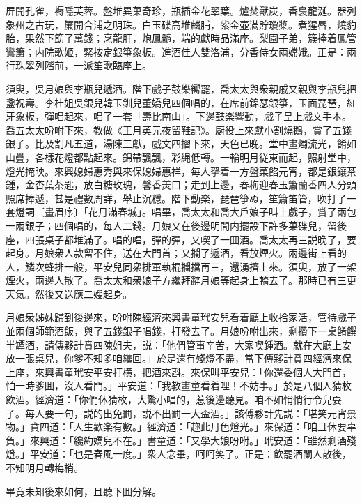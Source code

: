 \begin{myquote}
屏開孔雀，褥隱芙蓉。盤堆異菓奇珍，瓶插金花翠葉。爐焚獸炭，香裊龍涎。器列象州之古玩，簾開合浦之明珠。白玉碟高堆麟脯，紫金壺滿貯瓊槳。煮猩唇，燒豹胎，果然下筯了萬錢；烹龍肝，炮鳳髓，端的獻時品滿座。梨園子弟，簇捧着鳳管鸞簫；内院歌姬，緊按定銀箏象板。進酒佳人雙洛浦，分香侍女兩嫦娥。正是：兩行珠翠列階前，一派笙歌臨座上。
\end{myquote}

須臾，吳月娘與李瓶兒遞酒。階下戲子鼓樂嚮罷，喬太太與衆親戚又親與李瓶兒把盞祝壽。李桂姐吳銀兒韓玉釧兒董嬌兒四個唱的，在席前錦瑟銀箏，玉面琵琶，紅牙象板，彈唱起來，唱了一套「壽比南山」。下邊鼓楽響動，戲子呈上戲文手本。喬五太太吩咐下來，教做《王月英元夜留鞋記》。廚役上來獻小割燒鵝，賞了五錢銀子。比及割凡五道，湯陳三獻，戲文四摺下來，天色已晚。堂中畫燭流光，餚如山疊，各樣花燈都點起來。錦帶飄飄，彩䋲低轉。一輪明月従東而起，照射堂中，燈光掩映。來興媳婦惠秀與來保媳婦惠祥，每人拏着一方盤菓餡元宵，都是銀鑲茶鍾，金杏葉茶匙，放白糖玫瑰，馨香羙口；走到上邊，春梅迎春玉簫蘭香四人分頭照席捧遞，甚是禮數周詳，舉止沉穩。階下動楽，琵琶箏ぬ，笙簫笛管，吹打了一套燈詞〔畫眉序〕「花月滿春城」。唱畢，喬太太和喬大戶娘子叫上戲子，賞了兩包一兩銀子；四個唱的，每人二錢。月娘又在後邊明間内擺設下許多菓碟兒，留後座，四張桌子都堆滿了。唱的唱，彈的彈，又喫了一囬酒。喬太太再三説晚了，要起身。月娘衆人款留不住，送在大門首；又攔了遞酒，看放煙火。兩邊街上看的人，鱗次蜂排一般，平安兒同衆排軍執棍攔擋再三，還湧擠上來。須臾，放了一架煙火，兩邊人散了。喬太太和衆娘子方纔拜辭月娘等起身上轎去了。那時已有三更天氣。然後又送應二嫂起身。

月娘衆姊妹歸到後邊來，吩咐陳經濟來興書童玳安兒看着廳上收拾家活，管待戲子並兩個師範酒飯，與了五錢銀子唱錢，打發去了。月娘吩咐出來，剩攢下一桌餚饌半罈酒，請傳夥計賁四陳姐夫，説：「他們管事辛苦，大家喫鍾酒。就在大廳上安放一張桌兒，你爹不知多咱纔回。」於是還有殘燈不盡，當下傳夥計賁四經濟來保上座，來興書童玳安平安打横，把酒來斟。來保叫平安兒：「你還委個人大門首，怕一時爹囬，沒人看門。」平安道：「我教畫童看着哩！不妨事。」於是八個人猜枚飲酒。經濟道：「你們休猜枚，大驚小唱的，惹後邊聽見。咱不如悄悄行令兒耍子。每人要一句，説的出免罰，説不出罰一大盃酒。」該傅夥計先説：「堪笑元宵景物。」賁四道：「人生歡楽有數。」經濟道：「趂此月色燈光。」來保道：「咱且休要辜負。」來興道：「纔約嬌兒不在。」書童道：「又學大娘吩咐。」玳安道：「雖然剩酒殘燈。」平安道：「也是春風一度。」衆人念畢，呵呵笑了。正是：飲罷酒闌人散後，不知明月轉梅梢。

畢竟未知後來如何，且聽下囬分解。

